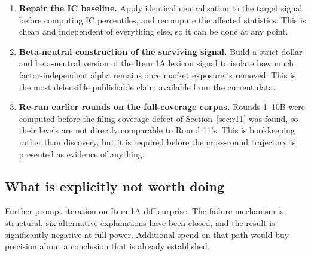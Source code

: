 \documentclass[11pt]{article}
\begin{document}
\begin{enumerate}[leftmargin=1.6em,itemsep=0.3em]
  \item \textbf{Repair the IC baseline.} Apply identical neutralisation to the target
        signal before computing IC percentiles, and recompute the affected statistics.
        This is cheap and independent of everything else, so it can be done at any point.

  \item \textbf{Beta-neutral construction of the surviving signal.} Build a strict dollar-
        and beta-neutral version of the Item 1A lexicon signal to isolate how much
        factor-independent alpha remains once market exposure is removed. This is the
        most defensible publishable claim available from the current data.

  \item \textbf{Re-run earlier rounds on the full-coverage corpus.} Rounds 1--10B were
        computed before the filing-coverage defect of Section~\ref{sec:r11} was found, so
        their levels are not directly comparable to Round 11's. This is bookkeeping rather
        than discovery, but it is required before the cross-round trajectory is presented
        as evidence of anything.

\end{enumerate}

\subsection{What is explicitly not worth doing}

Further prompt iteration on Item 1A diff-surprise. The failure mechanism is structural,
six alternative explanations have been closed, and the result is significantly negative at
full power. Additional spend on that path would buy precision about a conclusion that is
already established.
\end{document}
